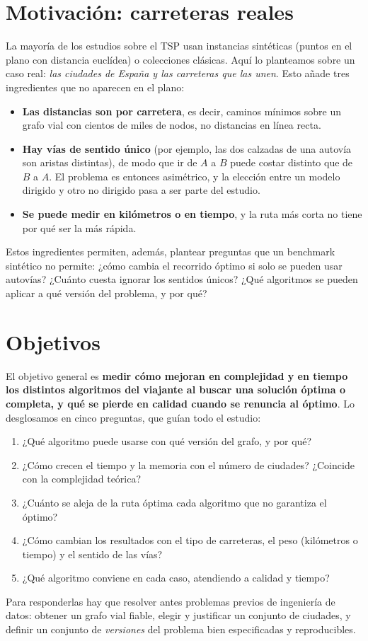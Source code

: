 \section{Motivación: carreteras reales}

La mayoría de los estudios sobre el TSP usan instancias sintéticas (puntos en el plano con distancia euclídea) o colecciones clásicas. Aquí lo
planteamos sobre un caso real: \emph{las ciudades de España y las carreteras que las unen}. Esto añade tres ingredientes que no aparecen en el plano:
\begin{itemize}
  \item \textbf{Las distancias son por carretera}, es decir, caminos mínimos sobre un grafo vial con cientos de miles de nodos, no distancias en línea recta.
  \item \textbf{Hay vías de sentido único} (por ejemplo, las dos calzadas de una autovía son aristas distintas), de modo que ir de $A$ a $B$ puede costar distinto que de $B$ a $A$.
        El problema es entonces asimétrico, y la elección entre un modelo dirigido y otro no dirigido pasa a ser parte del estudio.
  \item \textbf{Se puede medir en kilómetros o en tiempo}, y la ruta más corta no tiene por qué ser la más rápida.
\end{itemize}

Estos ingredientes permiten, además, plantear preguntas que un benchmark sintético no permite: ¿cómo cambia el recorrido óptimo si solo se pueden usar autovías?
¿Cuánto cuesta ignorar los sentidos únicos? ¿Qué algoritmos se pueden aplicar a qué versión del problema, y por qué?

\section{Objetivos}

El objetivo general es \textbf{medir cómo mejoran en complejidad y en tiempo los distintos algoritmos del viajante al buscar una solución óptima o completa, y qué
se pierde en calidad cuando se renuncia al óptimo}. Lo desglosamos en cinco preguntas, que guían todo el estudio:
\begin{enumerate}[label=\textbf{P\arabic*.}]
  \item ¿Qué algoritmo puede usarse con qué versión del grafo, y por qué?
  \item ¿Cómo crecen el tiempo y la memoria con el número de ciudades? ¿Coincide con la complejidad teórica?
  \item ¿Cuánto se aleja de la ruta óptima cada algoritmo que no garantiza el óptimo?
  \item ¿Cómo cambian los resultados con el tipo de carreteras, el peso (kilómetros o tiempo) y el sentido de las vías?
  \item ¿Qué algoritmo conviene en cada caso, atendiendo a calidad y tiempo?
\end{enumerate}
Para responderlas hay que resolver antes problemas previos de ingeniería de datos: obtener un grafo vial fiable, elegir y justificar un conjunto de ciudades, y
definir un conjunto de \emph{versiones} del problema bien especificadas y reproducibles.

